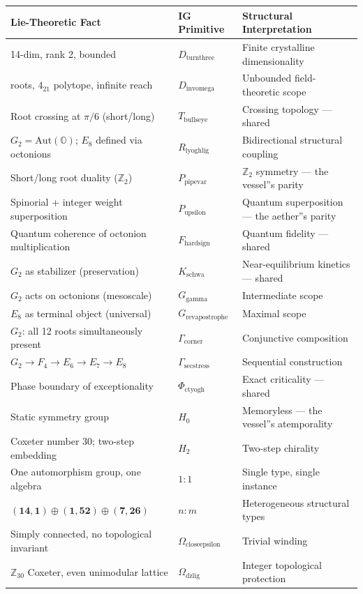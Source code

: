 \documentclass[12pt,a4paper]{article}
\begin{document}
\begin{table}[htbp]
\centering
\small
{}
\begin{tabularx}{\textwidth}{>{\centering\arraybackslash}X >{\centering\arraybackslash}X >{\centering\arraybackslash}X}
\toprule
\rowcolor{gray!25}\textbf{Lie-Theoretic Fact} & \textbf{IG Primitive} & \textbf{Structural Interpretation} \\
\midrule
\rowcolors{1}{white}{gray!10}
14-dim, rank 2, bounded & $D_{\text{turnthree}}$ & Finite crystalline dimensionality \\
240 roots, $4_{21}$ polytope, infinite reach & $D_{\text{invomega}}$ & Unbounded field-theoretic scope \\
Root crossing at $\pi/6$ (short/long) & $T_{\text{bullseye}}$ & Crossing topology --- shared \\
$G_2 = \text{Aut}(\mathbb{O})$; $E_8$ defined via octonions & $R_{\text{lyoghlig}}$ & Bidirectional structural coupling \\
Short/long root duality ($\mathbb{Z}_2$) & $P_{\text{pipevar}}$ & $\mathbb{Z}_2$ symmetry --- the vessel''s parity \\
Spinorial + integer weight superposition & $P_{\text{upsilon}}$ & Quantum superposition --- the aether''s parity \\
Quantum coherence of octonion multiplication & $F_{\text{hardsign}}$ & Quantum fidelity --- shared \\
$G_2$ as stabilizer (preservation) & $K_{\text{schwa}}$ & Near-equilibrium kinetics --- shared \\
$G_2$ acts on octonions (mesoscale) & $G_{\text{gamma}}$ & Intermediate scope \\
$E_8$ as terminal object (universal) & $G_{\text{revapostrophe}}$ & Maximal scope \\
$G_2$: all 12 roots simultaneously present & $\Gamma_{\text{corner}}$ & Conjunctive composition \\
$G_2 \to F_4 \to E_6 \to E_7 \to E_8$ & $\Gamma_{\text{secstress}}$ & Sequential construction \\
Phase boundary of exceptionality & $\Phi_{\text{ctyogh}}$ & Exact criticality --- shared \\
Static symmetry group & $H_0$ & Memoryless --- the vessel''s atemporality \\
Coxeter number 30; two-step embedding & $H_2$ & Two-step chirality \\
One automorphism group, one algebra & $1{:}1$ & Single type, single instance \\
$(\mathbf{14},\mathbf{1}) \oplus (\mathbf{1},\mathbf{52}) \oplus (\mathbf{7},\mathbf{26})$ & $n{:}m$ & Heterogeneous structural types \\
Simply connected, no topological invariant & $\Omega_{\text{closeepsilon}}$ & Trivial winding \\
$\mathbb{Z}_{30}$ Coxeter, even unimodular lattice & $\Omega_{\text{dzlig}}$ & Integer topological protection \\
\bottomrule
\end{tabularx}
\end{table}
\end{document}
